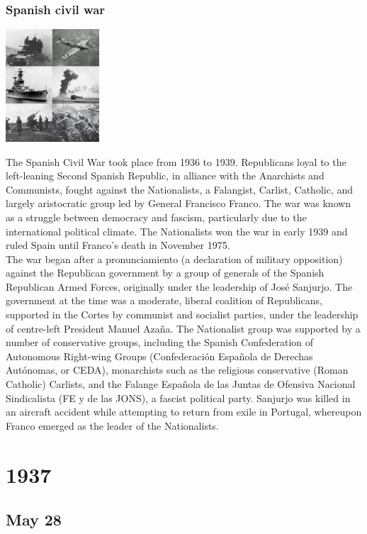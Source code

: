\documentclass[11pt]{report}
\begin{document}
\subsection{Spanish civil war}
\vspace{2mm}\begin{center}\includegraphics[width=3.5cm]{./img/spanishCivWar.jpg}\end{center}
The Spanish Civil War took place from 1936 to 1939. Republicans loyal to the left-leaning Second Spanish Republic, in alliance with the Anarchists and Communists, fought against the Nationalists, a Falangist, Carlist, Catholic, and largely aristocratic group led by General Francisco Franco. The war was known as a struggle between democracy and fascism, particularly due to the international political climate. The Nationalists won the war in early 1939 and ruled Spain until Franco's death in November 1975.\\ \indent The war began after a pronunciamiento (a declaration of military opposition) against the Republican government by a group of generals of the Spanish Republican Armed Forces, originally under the leadership of José Sanjurjo. The government at the time was a moderate, liberal coalition of Republicans, supported in the Cortes by communist and socialist parties, under the leadership of centre-left President Manuel Azaña. The Nationalist group was supported by a number of conservative groups, including the Spanish Confederation of Autonomous Right-wing Groups (Confederación Española de Derechas Autónomas, or CEDA), monarchists such as the religious conservative (Roman Catholic) Carlists, and the Falange Española de las Juntas de Ofensiva Nacional Sindicalista (FE y de las JONS), a fascist political party. Sanjurjo was killed in an aircraft accident while attempting to return from exile in Portugal, whereupon Franco emerged as the leader of the Nationalists.

\chapter{1937}
\section{May 28}
\end{document}
